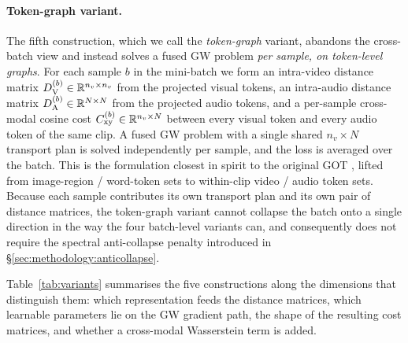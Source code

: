 \paragraph{Token-graph variant.}
The fifth construction, which we call the \emph{token-graph}
variant, abandons the cross-batch view and instead solves a fused
GW problem \emph{per sample, on token-level graphs}. For each
sample $b$ in the mini-batch we form an intra-video distance
matrix
$D_{\mathrm{V}}^{(b)} \in \mathbb{R}^{n_v \times n_v}$
from the projected visual tokens, an intra-audio distance matrix
$D_{\mathrm{A}}^{(b)} \in \mathbb{R}^{N \times N}$
from the projected audio tokens, and a per-sample cross-modal
cosine cost
$C_{\mathrm{xy}}^{(b)} \in \mathbb{R}^{n_v \times N}$
between every visual token and every audio token of the same
clip. A fused GW problem with a single shared $n_v \times N$
transport plan is solved independently per sample, and the loss
is averaged over the batch. This is the formulation closest in
spirit to the original GOT
\citep{chen_2020_graph}, lifted from image-region / word-token
sets to within-clip video / audio token sets. Because each sample
contributes its own transport plan and its own pair of distance
matrices, the token-graph variant cannot collapse the batch onto
a single direction in the way the four batch-level variants can,
and consequently does not require the spectral anti-collapse
penalty introduced in \S\ref{sec:methodology:anticollapse}.

Table~\ref{tab:variants} summarises the five constructions along
the dimensions that distinguish them: which representation feeds
the distance matrices, which learnable parameters lie on the GW
gradient path, the shape of the resulting cost matrices, and
whether a cross-modal Wasserstein term is added.

